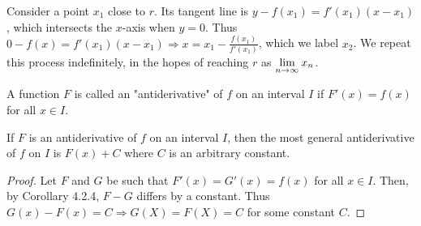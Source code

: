 \documentclass[a4paper,8pt]{article}
\begin{document}
\begin{outline}
    \begin{justification}
      Consider a point \(x_1\) close to \(r\). Its tangent line is \(y - f(x_1) = f'(x_1)(x - x_1)\), which
      intersects the \(x\)-axis when \(y = 0\). Thus \(0 - f(x) = f'(x_1)(x-x_1) \Rightarrow x = x_1 -
      \frac{f(x_1)}{f'(x_1)}\), which we label \(x_2\). We repeat this process indefinitely, in the hopes of reaching
      \(r\) as \(\lim\limits_{n\rightarrow \infty^{}}x_n\).
    \end{justification}

    A function \(F\) is called an "antiderivative" of \(f\) on an interval \(I\) if \(F'(x) = f(x)\) for all \(x \in I\).

    If \(F\) is an antiderivative of \(f\) on an interval \(I\), then the most general antiderivative of \(f\) on \(I\)
    is \(F(x) + C\) where \(C\) is an arbitrary constant.

    \begin{proof}
      Let \(F\) and \(G\) be such that \(F'(x) = G'(x) = f(x)\) for all \(x \in I\). Then, by Corollary 4.2.4, \(F-G\)
      differs by a constant. Thus \(G(x)-F(x)=C \Rightarrow G(X) = F(X) = C\) for some constant \(C\).
    \end{proof}

\end{outline}
\end{document}
